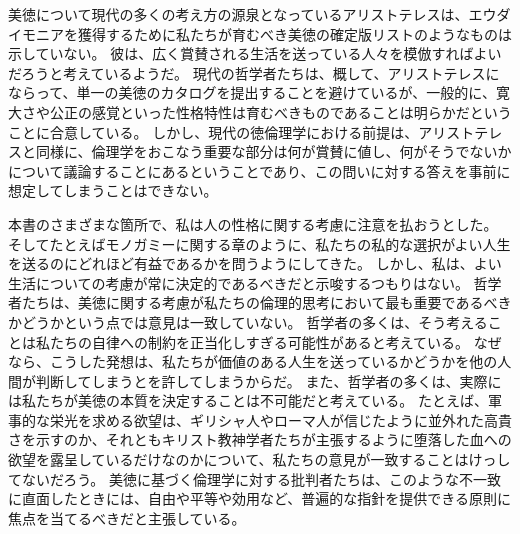 \documentclass[paper=a4,book,openany]{jlreq}
\begin{document}
美徳について現代の多くの考え方の源泉となっているアリストテレスは、エウダイモニアを獲得するために私たちが育むべき美徳の確定版リストのようなものは示していない。
彼は、広く賞賛される生活を送っている人々を模倣すればよいだろうと考えているようだ。
現代の哲学者たちは、概して、アリストテレスにならって、単一の美徳のカタログを提出することを避けているが、一般的に、寛大さや公正の感覚といった性格特性は育むべきものであることは明らかだということに合意している。
しかし、現代の徳倫理学における前提は、アリストテレスと同様に、倫理学をおこなう重要な部分は何が賞賛に値し、何がそうでないかについて議論することにあるということであり、この問いに対する答えを事前に想定してしまうことはできない。

本書のさまざまな箇所で、私は人の性格に関する考慮に注意を払おうとした。
そしてたとえばモノガミーに関する章のように、私たちの私的な選択がよい人生を送るのにどれほど有益であるかを問うようにしてきた。
しかし、私は、よい生活についての考慮が常に決定的であるべきだと示唆するつもりはない。
哲学者たちは、美徳に関する考慮が私たちの倫理的思考において最も重要であるべきかどうかという点では意見は一致していない。
哲学者の多くは、そう考えることは私たちの自律への制約を正当化しすぎる可能性があると考えている。
なぜなら、こうした発想は、私たちが価値のある人生を送っているかどうかを他の人間が判断してしまうとを許してしまうからだ。
また、哲学者の多くは、実際には私たちが美徳の本質を決定することは不可能だと考えている。
たとえば、軍事的な栄光を求める欲望は、ギリシャ人やローマ人が信じたように並外れた高貴さを示すのか、それともキリスト教神学者たちが主張するように堕落した血への欲望を露呈しているだけなのかについて、私たちの意見が一致することはけっしてないだろう。
美徳に基づく倫理学に対する批判者たちは、このような不一致に直面したときには、自由や平等や効用など、普遍的な指針を提供できる原則に焦点を当てるべきだと主張している。

\vspace{1\zw}
\end{document}
